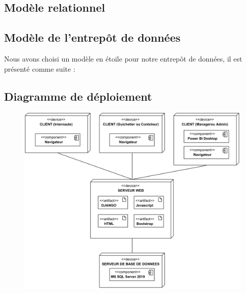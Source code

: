     \subsection[Modèle relationnel]{Modèle relationnel}
    \subsection[Modèle de l'entrepôt de données]{Modèle de l'entrepôt de données}
    Nous avons choisi un modèle en étoile pour notre entrepôt de données, il
    est présenté comme suite : 
    \subsection[Diagramme de déploiement]{Diagramme de déploiement}
        \begin{figure}[H]
            \centering
            \includegraphics[width=150mm]{images/diagramme-de-deploiement/Diagramme de deploiement Deployment Diagram.png}
            \label{fig:diagDeploi}
        \end{figure}